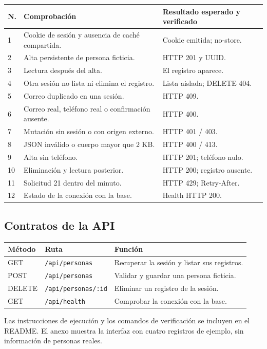 \documentclass[11pt,a4paper]{article}
\begin{document}
{\small
\begin{tabularx}{\textwidth}{@{}P{.7cm}YP{3.2cm}@{}}
\toprule
\textbf{N.} & \textbf{Comprobación} & \textbf{Resultado esperado y verificado}\\
 & Cookie de sesión y ausencia de caché compartida. & Cookie emitida; no-store.\\
2 & Alta persistente de persona ficticia. & HTTP 201 y UUID.\\
3 & Lectura después del alta. & El registro aparece.\\
4 & Otra sesión no lista ni elimina el registro. & Lista aislada; DELETE 404.\\
5 & Correo duplicado en una sesión. & HTTP 409.\\
6 & Correo real, teléfono real o confirmación ausente. & HTTP 400.\\
7 & Mutación sin sesión o con origen externo. & HTTP 401 / 403.\\
8 & JSON inválido o cuerpo mayor que 2 KB. & HTTP 400 / 413.\\
9 & Alta sin teléfono. & HTTP 201; teléfono nulo.\\
10 & Eliminación y lectura posterior. & HTTP 200; registro ausente.\\
11 & Solicitud 21 dentro del minuto. & HTTP 429; Retry-After.\\
12 & Estado de la conexión con la base. & Health HTTP 200.\\
\bottomrule
\end{tabularx}}

\subsection{Contratos de la API}
{\small
\begin{tabularx}{\textwidth}{@{}P{1.5cm}P{4.1cm}Y@{}}
\toprule
\textbf{Método} & \textbf{Ruta} & \textbf{Función}\\
\midrule
GET & \texttt{/api/personas} & Recuperar la sesión y listar sus registros.\\
POST & \texttt{/api/personas} & Validar y guardar una persona ficticia.\\
DELETE & \texttt{/api/personas/:id} & Eliminar un registro de la sesión.\\
GET & \texttt{/api/health} & Comprobar la conexión con la base.\\
\bottomrule
\end{tabularx}}
Las instrucciones de ejecución y los comandos de verificación se incluyen en el README. El anexo muestra la interfaz con cuatro registros de ejemplo, sin información de personas reales.
\end{document}
